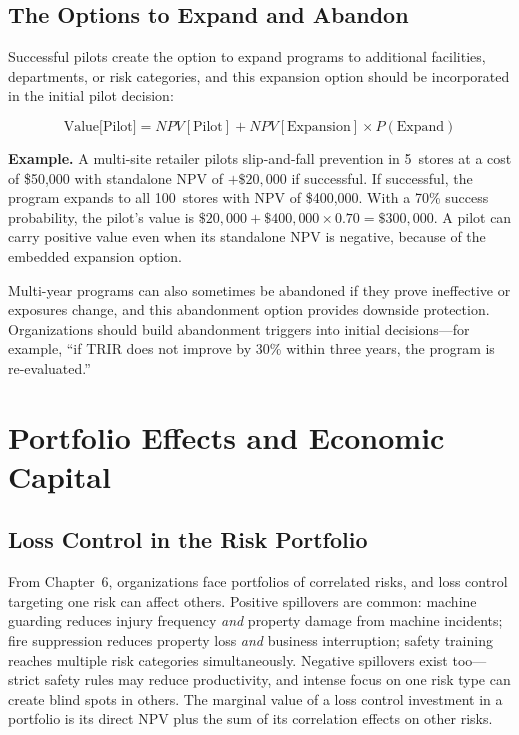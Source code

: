 \documentclass[11pt,openany]{book}
\begin{document}
\subsection{The Options to Expand and Abandon}

Successful pilots create the option to expand programs to additional
facilities, departments, or risk categories, and this expansion option should
be incorporated in the initial pilot decision:

\[
\text{Value[Pilot]} = NPV[\text{Pilot}] + NPV[\text{Expansion}] \times
P(\text{Expand})
\]

\textbf{Example.} A multi-site retailer pilots slip-and-fall prevention in
5~stores at a cost of \$50{,}000 with standalone NPV of \(+\$20{,}000\) if
successful. If successful, the program expands to all 100~stores with NPV of
\$400{,}000. With a 70\% success probability, the pilot's value is
\(\$20{,}000 + \$400{,}000 \times 0.70 = \$300{,}000\). A pilot can carry
positive value even when its standalone NPV is negative, because of the
embedded expansion option.

Multi-year programs can also sometimes be abandoned if they prove ineffective
or exposures change, and this abandonment option provides downside protection.
Organizations should build abandonment triggers into initial decisions---for
example, ``if TRIR does not improve by 30\% within three years, the program is
re-evaluated.''

\section{Portfolio Effects and Economic Capital}
\label{sec:appendix-portfolio}

\subsection{Loss Control in the Risk Portfolio}

From Chapter~6, organizations face portfolios of correlated risks, and loss
control targeting one risk can affect others. Positive spillovers are common:
machine guarding reduces injury frequency \emph{and} property damage from
machine incidents; fire suppression reduces property loss \emph{and} business
interruption; safety training reaches multiple risk categories simultaneously.
Negative spillovers exist too---strict safety rules may reduce productivity,
and intense focus on one risk type can create blind spots in others. The
marginal value of a loss control investment in a portfolio is its direct NPV
plus the sum of its correlation effects on other risks.
\end{document}
